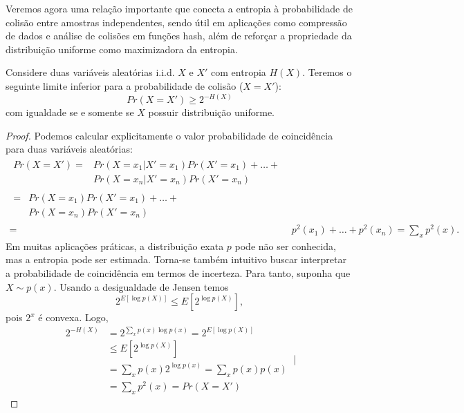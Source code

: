 Veremos agora uma relação importante que conecta a entropia à probabilidade de
colisão entre amostras independentes, sendo útil em aplicações como compressão
de dados e análise de colisões em funções hash, além de reforçar a propriedade
da distribuição uniforme como maximizadora da entropia.
\begin{proposition}
    Considere duas variáveis aleatórias i.i.d. $X$ e $X'$ com entropia $H(X)$.
    Teremos o seguinte limite inferior para a probabilidade de colisão ($X = X'$):
    \begin{equation}
      Pr(X = X') \geq 2^{-H(X)}
    \end{equation}
    com igualdade se e somente se $X$ possuir distribuição uniforme.
\end{proposition}
\begin{proof}
  Podemos calcular explicitamente o valor probabilidade de coincidência para duas variáveis aleatórias:
  \begin{subequations}
    \begin{align}
      \begin{split}
        Pr(X = X') ={}& Pr(X=x_1|X'=x_1)Pr(X'=x_1) + \ldots + \\
                      & Pr(X=x_n|X'=x_n)Pr(X'=x_n) 
      \end{split}\\
      \begin{split}
        ={}& Pr(X=x_1)Pr(X'=x_1) + \ldots + \\
           & Pr(X=x_n)Pr(X'=x_n)
      \end{split}\\
        ={}& p^2(x_1) + \ldots + p^2(x_n) = \sum_x p^2(x) .\label{eq:colprob}
    \end{align}
  \end{subequations}
  Em muitas aplicações práticas, a distribuição exata $p$ pode não ser conhecida,
  mas a entropia pode ser estimada. Torna-se também intuitivo buscar interpretar a probabilidade de coincidência em termos de incerteza.
  Para tanto, suponha que $X \sim p(x)$. Usando a desigualdade de Jensen temos
  \begin{equation}
    2^{E[\log p(X)]} \leq E[2^{\log p(X)}] ,
  \end{equation}
  pois $2^x$ é convexa. Logo,
  \begin{subequations}
    \begin{align}
      2^{-H(X)} &= 2^{\sum_x p(x) \log p(x)} = 2^{E[\log p(X)]} \\
                &\leq E[2^{\log p(X)}] \\
                &= \sum_x p(x) 2^{\log p(x)} = \sum_x p(x)p(x) \\
                &= \sum_x p^2(x) = Pr(X = X')
    \end{align}
│ \end{subequations}
\end{proof}
